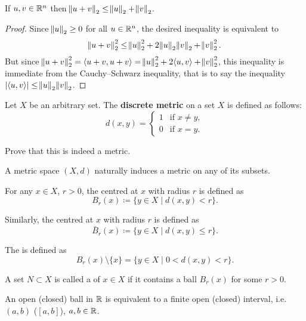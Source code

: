 \begin{lemma}
If $u,v\in\mathbb R^n$ then $\norm{u+v}_2\le\norm{u}_2+\norm{v}_2$.
\end{lemma}

\begin{proof}
Since $\norm{u}_2\ge0$ for all $u\in\mathbb R^n$, the desired inequality is equivalent to
\[\norm{u+v}_2^2\le\norm{u}_2^2+2\norm{u}_2\norm{v}_2+\norm{v}_2^2.\]
But since $\norm{u+v}_2^2=\langle u+v,u+v\rangle=\norm{u}_2^2+2\langle u,v\rangle+\norm{v}_2^2$, this inequality is immediate from the Cauchy--Schwarz inequality, that is to say the inequality $|\langle u,v\rangle|\le\norm{u}_2\norm{v}_2$.
\end{proof}

\begin{example}
Let $X$ be an arbitrary set. The \textbf{discrete metric} on a set $X$ is defined as follows:
\[d(x,y)=\begin{cases}
1&\text{if }x\neq y,\\
0&\text{if }x=y.
\end{cases}\]
\end{example}

\begin{exercise}
Prove that this is indeed a metric.
\end{exercise}

A metric space $(X,d)$ naturally induces a metric on any of its subsets.

\begin{definition}
For any $x\in X$, $r>0$, the  centred at $x$ with radius $r$ is defined as
\[B_r(x)\coloneqq\{y\in X\mid d(x,y)<r\}.\]

Similarly, the  centred at $x$ with radius $r$ is defined as
\[\bar{B}_r(x)\coloneqq\{y\in X\mid d(x,y)\le r\}.\]

The  is defined as
\[B_r(x)\setminus\{x\}=\{y\in X\mid 0<d(x,y)<r\}.\]
\end{definition}

\begin{definition}[Neighbourhood]
A set $N\subset X$ is called a  of $x\in X$ if it contains a ball $B_r(x)$ for some $r>0$.
\end{definition}

\begin{example}
An open (closed) ball in $\mathbb R$ is equivalent to a finite open (closed) interval, i.e. $(a,b)$ ($[a,b]$), $a,b\in\mathbb R$.
\end{example}

